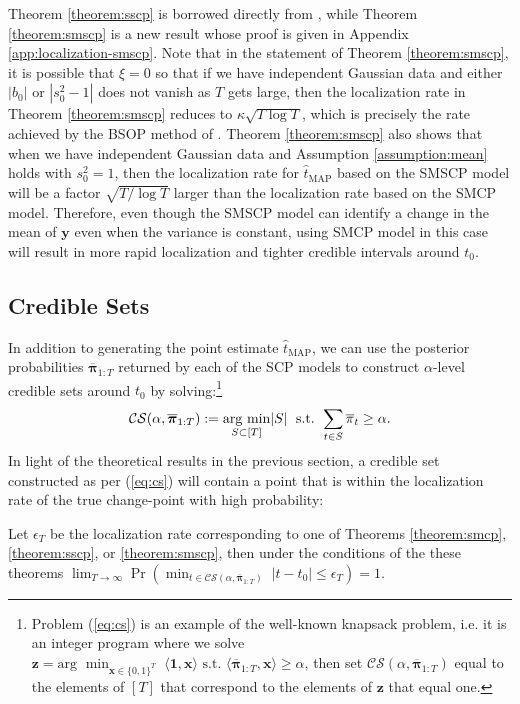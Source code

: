 Theorem \ref{theorem:sscp} is borrowed directly from \cite{Cappello22}, while Theorem \ref{theorem:smscp} is a new result whose proof is given in Appendix \ref{app:localization-smscp}. Note that in the statement of Theorem \ref{theorem:smscp}, it is possible that $\xi =0$ so that if we have independent Gaussian data and either $|b_0|$ or $|s^2_0-1|$ does not vanish as $T$ gets large, then the localization rate in Theorem \ref{theorem:smscp} reduces to $\kappa \sqrt{T\log T}$, which is precisely the rate achieved by the BSOP method of \cite{Wang21}. Theorem \ref{theorem:smscp} also shows that when we have independent Gaussian data and Assumption \ref{assumption:mean} holds with $s_0^2 = 1$, then the localization rate for $\hat{t}_{\text{MAP}}$ based on the SMSCP model will be a factor $\sqrt{T/\log T}$ larger than the localization rate based on the SMCP model. Therefore, even though the SMSCP model can identify a change in the mean of $\mathbf{y}$ even when the variance is constant, using SMCP model in this case will result in more rapid localization and tighter credible intervals around $t_0$. 

\subsection{Credible Sets}
\label{sec:cred-sets}

In addition to generating the point estimate $\hat{t}_\text{MAP}$, we can use the posterior probabilities $\overline{\boldsymbol{\pi}}_{1:T}$ returned by each of the SCP models to construct $\alpha$-level credible sets around $t_0$ by solving:\footnote{Problem (\ref{eq:cs}) is an example of the well-known knapsack problem, i.e. it is an integer program where we solve $\mathbf{z} = \text{arg }\min_{\mathbf{x}\in\{0,1\}^T} \; \langle\mathbf{1}, \mathbf{x}\rangle \text{ s.t. } \langle \overline{\boldsymbol{\pi}}_{1:T}, \mathbf{x}\rangle \geq \alpha$, then set $\mathcal{CS}(\alpha, \overline{\boldsymbol{\pi}}_{1:T})$ equal to the elements of $[T]$ that correspond to the elements of $\mathbf{z}$ that equal one.}
\begin{align}\label{eq:cs}
    \mathcal{CS}(\alpha, \overline{\boldsymbol{\pi}}_{1:T}) := \underset{S \subset [T]}{\text{arg min}} |S| \;\text{ s.t. } \sum_{t \in S} \overline{\pi}_t \geq \alpha.
\end{align}
In light of the theoretical results in the previous section, a credible set constructed as per (\ref{eq:cs}) will contain a point that is within the localization rate of the true change-point with high probability:
\begin{corollary} \label{cor:cred-sets}
Let $\epsilon_T$ be the localization rate corresponding to one of Theorems \ref{theorem:smcp}, \ref{theorem:sscp}, or \ref{theorem:smscp}, then under the conditions of the these theorems $\lim_{T \to \infty} \Pr\left(\min_{t\in \mathcal{CS}(\alpha, \overline{\boldsymbol{\pi}}_{1:T})} \; |t - t_0| \leq \epsilon_T \right) = 1.$
\end{corollary}

